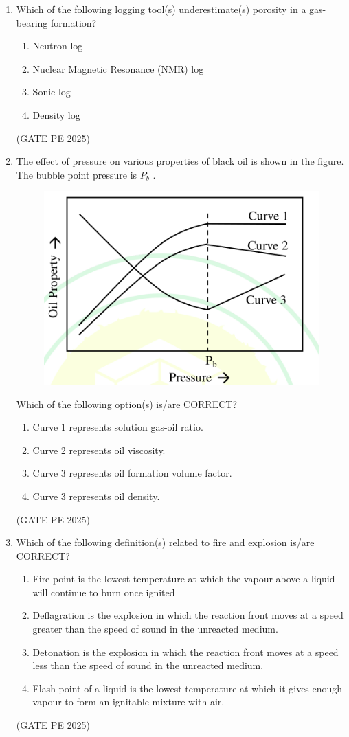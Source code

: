 \documentclass[journal,12pt,onecolumn]{IEEEtran}
\theoremstyle{remark}
\begin{document}
\begin{enumerate}
\item Which of the following logging tool(s) underestimate(s) porosity in a gas-bearing formation?
\begin{enumerate}
    \item Neutron log
    \item Nuclear Magnetic Resonance (NMR) log
    \item Sonic log
    \item Density log
\end{enumerate}
\hfill{(GATE PE 2025)}


\item The effect of pressure on various properties of black oil is shown in the figure. The bubble point pressure is $P_b$ .\\
\begin{figure}[H]
    \centering
    \includegraphics[width=0.5\columnwidth]{25Q46.png}
    \caption{}
    \label{fig:placeholder}
\end{figure}
Which of the following option(s) is/are CORRECT?
\begin{enumerate}
    \item Curve 1 represents solution gas-oil ratio.
    \item Curve 2 represents oil viscosity.
    \item Curve 3 represents oil formation volume factor.
    \item Curve 3 represents oil density.
\end{enumerate}
\hfill{(GATE PE 2025)}

\item Which of the following definition(s) related to fire and explosion is/are CORRECT?
\begin{enumerate}
    \item Fire point is the lowest temperature at which the vapour above a liquid will continue to burn once ignited
    \item Deflagration is the explosion in which the reaction front moves at a speed greater than the speed of sound in the unreacted medium.
    \item Detonation is the explosion in which the reaction front moves at a speed less than the speed of sound in the unreacted medium.
    \item Flash point of a liquid is the lowest temperature at which it gives enough vapour to form an ignitable mixture with air.
\end{enumerate}
\hfill{(GATE PE 2025)}



\end{enumerate}
\end{document}
